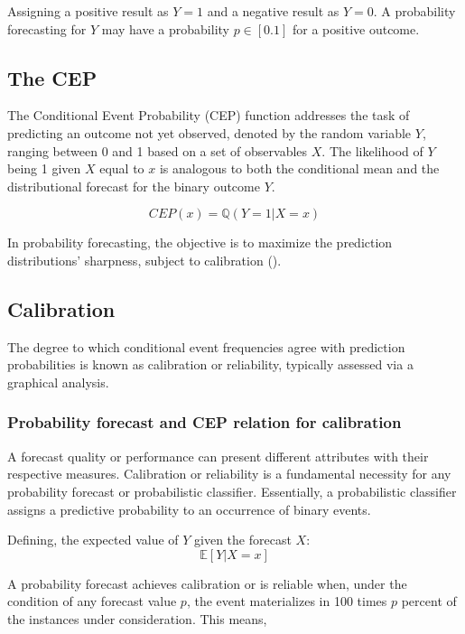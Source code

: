 \documentclass[a4paper,12pt]{article}
\numberwithin{equation}{section}
\begin{document}
Assigning a positive result as $Y = 1$ and a negative result as $Y = 0$. A probability forecasting for $Y$ may have a probability $p \in [0.1]$ for a positive outcome.

   \subsection{The CEP} \label{Chapter:CEP}  
   The Conditional Event Probability (CEP) function addresses the task of predicting an outcome not yet observed, denoted by the random variable $Y$, ranging between 0 and 1 based on a set of observables $X$. The likelihood of $Y$ being 1 given $X$ equal to $x$ is analogous to both the conditional mean and the distributional forecast for the binary outcome $Y$.
         
   \begin{equation} \label{eq:CEP} 
   CEP(x) = \mathbb{Q}(Y = 1 | X = x)
   \end{equation}
  
   In probability forecasting, the objective is to maximize the prediction distributions' sharpness, subject to calibration (\cite{Forecast1}).

   \subsection{Calibration}
   The degree to which conditional event frequencies agree with prediction probabilities is known as calibration or reliability, typically assessed via a graphical analysis.

      \subsubsection{Probability forecast and CEP relation for calibration}
      A forecast quality or performance can present different attributes with their respective measures. Calibration or reliability is a fundamental necessity for any probability forecast or probabilistic classifier. Essentially, a probabilistic classifier assigns a predictive probability to an occurrence of binary events. \bigskip

      Defining, the expected value of $Y$ given the forecast $X$:
      \begin{equation} \label{eq: expected} 
      \mathbb{E}[Y | X = x] 
      \end{equation}

      A probability forecast achieves calibration or is reliable when, under the condition of any forecast value $p$, the event materializes in 100 times $p$ percent of the instances under consideration. This means,
      
\end{document}
